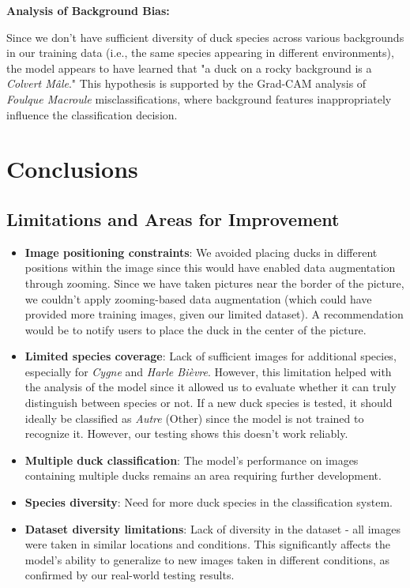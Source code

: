 \documentclass[12pt,a4paper]{article}
\begin{document}
\textbf{Analysis of Background Bias:}

Since we don't have sufficient diversity of duck species across various backgrounds in our training data (i.e., the same species appearing in different environments), the model appears to have learned that "a duck on a rocky background is a \textit{Colvert Mâle}." This hypothesis is supported by the Grad-CAM analysis of \textit{Foulque Macroule} misclassifications, where background features inappropriately influence the classification decision.

\section{Conclusions}

\subsection{Limitations and Areas for Improvement}

\begin{itemize}
    \item \textbf{Image positioning constraints}: We avoided placing ducks in different positions within the image since this would have enabled data augmentation through zooming. Since we have taken pictures near the border of the picture, we couldn't apply zooming-based data augmentation (which could have provided more training images, given our limited dataset). A recommendation would be to notify users to place the duck in the center of the picture.

    \item \textbf{Limited species coverage}: Lack of sufficient images for additional species, especially for \textit{Cygne} and \textit{Harle Bièvre}. However, this limitation helped with the analysis of the model since it allowed us to evaluate whether it can truly distinguish between species or not. If a new duck species is tested, it should ideally be classified as \textit{Autre} (Other) since the model is not trained to recognize it. However, our testing shows this doesn't work reliably.

    \item \textbf{Multiple duck classification}: The model's performance on images containing multiple ducks remains an area requiring further development.

    \item \textbf{Species diversity}: Need for more duck species in the classification system.

    \item \textbf{Dataset diversity limitations}: Lack of diversity in the dataset - all images were taken in similar locations and conditions. This significantly affects the model's ability to generalize to new images taken in different conditions, as confirmed by our real-world testing results.
\end{itemize}
\end{document}
